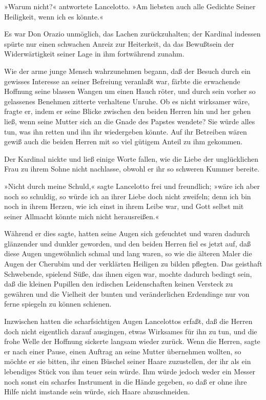 »Warum nicht?« antwortete Lancelotto. »Am liebsten auch alle
Gedichte Seiner Heiligkeit, wenn ich es könnte.«

Es war Don Orazio unmöglich, das Lachen zurückzuhalten; der
Kardinal indessen spürte nur einen schwachen \pagenum{[60]} Anreiz
zur Heiterkeit, da das Bewußtsein der Widerwärtigkeit seiner Lage
in ihm fortwährend zunahm.

Wie der arme junge Mensch wahrzunehmen begann, daß der Besuch durch
ein gewisses Interesse an seiner Befreiung veranlaßt war, färbte
die erwachende Hoffnung seine blassen Wangen um einen Hauch röter,
und durch sein vorher so gelassenes Benehmen zitterte verhaltene
Unruhe. Ob es nicht wirksamer wäre, fragte er, indem er seine
Blicke zwischen den beiden Herren hin und her gehen ließ, wenn
seine Mutter sich an die Gnade des Papstes wendete? Sie würde alles
tun, was ihn retten und ihn ihr wiedergeben könnte. Auf ihr
Betreiben wären gewiß auch die beiden Herren mit so viel gütigem
Anteil zu ihm gekommen.

Der Kardinal nickte und ließ einige Worte fallen, wie die Liebe der
unglücklichen Frau zu ihrem Sohne nicht nachlasse, obwohl er ihr so
schweren Kummer bereite.

»Nicht durch meine Schuld,« sagte Lancelotto frei und freundlich;
»wäre ich aber noch so schuldig, so würde ich an ihrer Liebe doch
nicht zweifeln; denn ich bin noch in ihrem Herzen, wie ich einst in
ihrem Leibe war, und Gott selbst mit seiner Allmacht könnte mich
nicht herausreißen.«

Während er dies sagte, hatten seine Augen sich gefeuchtet und waren
dadurch glänzender und dunkler geworden, und den beiden Herren fiel
es jetzt auf, daß diese Augen ungewöhnlich schmal und lang waren,
so wie die älteren Maler die Augen der Cherubim und der verklärten
Heiligen zu bilden pflegten. Das geisthaft Schwebende, spielend
Süße, das ihnen eigen war, mochte dadurch bedingt sein, daß die
kleinen Pupillen den irdischen Leidenschaften keinen Versteck zu
gewähren und die Vielheit der bunten und veränderlichen Erdendinge
nur von ferne spiegeln zu können schienen.

\pagenum{[61]} Inzwischen hatten die scharfsichtigen Augen
Lancelottos erfaßt, daß die Herren doch nicht eigentlich darauf
ausgingen, etwas Wirksames für ihn zu tun, und die frohe Welle der
Hoffnung sickerte langsam wieder zurück. Wenn die Herren, sagte er
nach einer Pause, einen Auftrag an seine Mutter übernehmen wollten,
so möchte er sie bitten, ihr einen Büschel seiner Haare
zuzustellen, der ihr als ein lebendiges Stück von ihm teuer sein
würde. Ihm würde jedoch weder ein Messer noch sonst ein scharfes
Instrument in die Hände gegeben, so daß er ohne ihre Hilfe nicht
imstande sein würde, sich Haare abzuschneiden.

